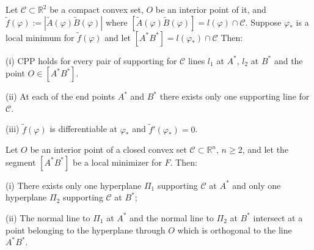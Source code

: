 \documentclass[10pt,a4paper]{amsart}
\begin{document}
\begin{prop} \label{dim2prop}
Let $\mathcal C \subset \mathbb{R}^2$ be a compact convex set,  $O$ be an interior point of it, and
$\tilde{f}(\varphi) := |\tilde{A}(\varphi)\tilde{B}(\varphi)|$ where $[\tilde{A}(\varphi)\tilde{B}(\varphi)]=  l(\varphi)\cap \mathcal{C}$. Suppose $\varphi_*$ is a local minimum for $\tilde{f}(\varphi)$ and let $[A^*B^*]= l(\varphi_*) \cap \mathcal C$  Then:

(i) CPP holds for every pair of supporting for $\mathcal C$ lines
$l_1$ at $A^*$, $l_2$ at $B^*$ and the point $O \in [A^*B^*]$.

(ii) At each of the end points  $A^*$ and $B^*$ there exists only one supporting line for $\mathcal C$.

(iii) $\tilde{f}(\varphi)$ is differentiable at $\varphi_*$ and $\tilde{f}'(\varphi_*) = 0$.

\end{prop}

\begin{thm} \label{thmmin}
Let $O$ be an interior point of a closed convex set $\mathcal C
\subset \mathbb{R}^n,\, n \geq 2$, and let the segment $[A^*B^*]$
be a local minimizer for $F$. Then:

(i) There exists only one hyperplane $\Pi_1$   supporting $\mathcal C$   at  $A^*$ and only one hyperplane $\Pi_2$ supporting $\mathcal C$  at $B^*$;

(ii) The normal line to $\Pi_1$ at $A^*$ and the normal line to
$\Pi_2$ at $B^*$ intersect at a point belonging to the hyperplane
through $O$ which is orthogonal to the line $A^*B^*$.
\end{thm}
\end{document}

